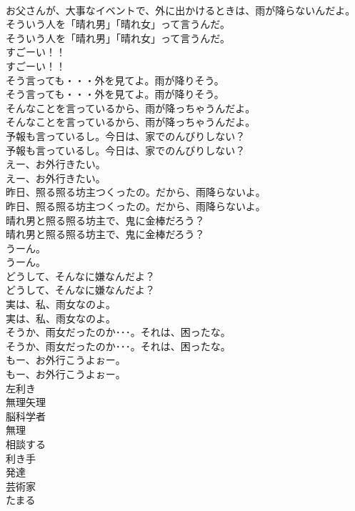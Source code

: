 \documentclass[8pt]{extreport}
\begin{document}
\begin{CJK}{UTF8}{min}
\\	お父さんが、大事なイベントで、外に出かけるときは、雨が降らないんだよ。 
\\	そういう人を「晴れ男」「晴れ女」って言うんだ。	
\\	そういう人を「晴れ男」「晴れ女」って言うんだ。 
\\	すごーい！！	
\\	すごーい！！ 
\\	そう言っても・・・外を見てよ。雨が降りそう。	
\\	そう言っても・・・外を見てよ。雨が降りそう。 
\\	そんなことを言っているから、雨が降っちゃうんだよ。	
\\	そんなことを言っているから、雨が降っちゃうんだよ。 
\\	予報も言っているし。今日は、家でのんびりしない？	
\\	予報も言っているし。今日は、家でのんびりしない？ 
\\	えー、お外行きたい。	
\\	えー、お外行きたい。 
\\	昨日、照る照る坊主つくったの。だから、雨降らないよ。	
\\	昨日、照る照る坊主つくったの。だから、雨降らないよ。 
\\	晴れ男と照る照る坊主で、鬼に金棒だろう？	
\\	晴れ男と照る照る坊主で、鬼に金棒だろう？ 
\\	うーん。	
\\	うーん。 
\\	どうして、そんなに嫌なんだよ？	
\\	どうして、そんなに嫌なんだよ？ 
\\	実は、私、雨女なのよ。	
\\	実は、私、雨女なのよ。 
\\	そうか、雨女だったのか･･･。それは、困ったな。	
\\	そうか、雨女だったのか･･･。それは、困ったな。 
\\	もー、お外行こうよぉー。	
\\	もー、お外行こうよぉー。 
\\	左利き
\\	無理矢理
\\	脳科学者
\\	無理
\\	相談する
\\	利き手
\\	発達
\\	芸術家
\\	たまる

\end{CJK}
\end{document}
